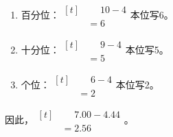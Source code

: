 {\begin{enumerate}[leftmargin=1.7em,itemsep=5pt,topsep=0pt]
\item 百分位：\(\begin{aligned}[t]&\phantom{={}}10-4\\&=6\end{aligned}\)\quad 本位写6。
\item 十分位：\(\begin{aligned}[t]&\phantom{={}}9-4\\&=5\end{aligned}\)\quad 本位写5。
\item 个位：\(\begin{aligned}[t]&\phantom{={}}6-4\\&=2\end{aligned}\)\quad 本位写2。
\end{enumerate}
\par\smallskip
因此，\(\begin{aligned}[t]&\phantom{={}}7.00-4.44\\&=2.56\end{aligned}\)。
\par\medskip

}
